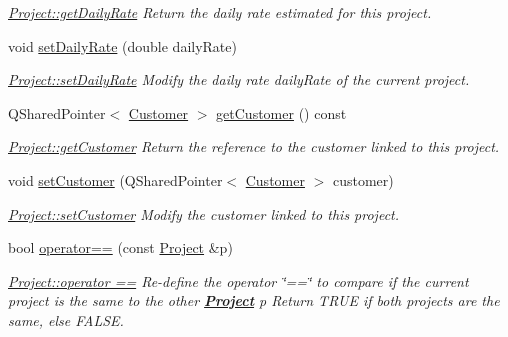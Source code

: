 \begin{DoxyCompactItemize}
\begin{DoxyCompactList}\small\item\em \hyperlink{classModels_1_1Project_a46d74a7452e712d223f1ca444a4cc180}{Project\-::get\-Daily\-Rate} Return the daily rate estimated for this project. \end{DoxyCompactList}\item 
void \hyperlink{classModels_1_1Project_a9bc03d9632334a550bd25f6286d2c7a2}{set\-Daily\-Rate} (double daily\-Rate)
\begin{DoxyCompactList}\small\item\em \hyperlink{classModels_1_1Project_a9bc03d9632334a550bd25f6286d2c7a2}{Project\-::set\-Daily\-Rate} Modify the daily rate {\itshape daily\-Rate} of the current project. \end{DoxyCompactList}\item 
Q\-Shared\-Pointer$<$ \hyperlink{classModels_1_1Customer}{Customer} $>$ \hyperlink{classModels_1_1Project_ad15f442a24c9d42144b73f27a7afaa35}{get\-Customer} () const 
\begin{DoxyCompactList}\small\item\em \hyperlink{classModels_1_1Project_ad15f442a24c9d42144b73f27a7afaa35}{Project\-::get\-Customer} Return the reference to the customer linked to this project. \end{DoxyCompactList}\item 
void \hyperlink{classModels_1_1Project_a9d305edf054735b911e144516d3eccba}{set\-Customer} (Q\-Shared\-Pointer$<$ \hyperlink{classModels_1_1Customer}{Customer} $>$ customer)
\begin{DoxyCompactList}\small\item\em \hyperlink{classModels_1_1Project_a9d305edf054735b911e144516d3eccba}{Project\-::set\-Customer} Modify the {\itshape customer} linked to this project. \end{DoxyCompactList}\item 
bool \hyperlink{classModels_1_1Project_a2f322e63f6b42273c24093b9df46c2d6}{operator==} (const \hyperlink{classModels_1_1Project}{Project} \&p)
\begin{DoxyCompactList}\small\item\em \hyperlink{classModels_1_1Project_a2f322e63f6b42273c24093b9df46c2d6}{Project\-::operator ==} Re-\/define the operator \char`\"{}==\char`\"{} to compare if the current project is the same to the other {\bfseries \hyperlink{classModels_1_1Project}{Project}} {\itshape p} Return T\-R\-U\-E if both projects are the same, else F\-A\-L\-S\-E. \end{DoxyCompactList}\item 

\end{DoxyCompactItemize}
